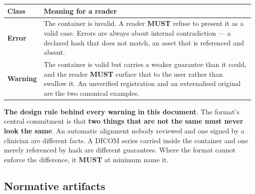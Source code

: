 \documentclass[11pt,a4paper]{article}
\newcommand{\MUST}{\textcolor{uosred}{\textbf{MUST}}}
\begin{document}
\begin{longtable}{L{2.6cm} L{12.8cm}}
\toprule
\textbf{Class} & \textbf{Meaning for a reader}\\
\midrule
\endhead
\textbf{Error} & The container is invalid. A reader \MUST{} refuse to present it as a
valid case. Errors are always about internal contradiction --- a declared hash that does
not match, an asset that is referenced and absent.\\
\textbf{Warning} & The container is valid but carries a weaker guarantee than it could,
and the reader \MUST{} surface that to the user rather than swallow it. An unverified
registration and an externalised original are the two canonical examples.\\
\bottomrule
\end{longtable}

\textbf{The design rule behind every warning in this document}. 
The format's central commitment is that \textbf{two things that are not the same must
never look the same}. An automatic alignment nobody reviewed and one signed by a clinician
are different facts. A DICOM series carried inside the container and one merely referenced
by hash are different guarantees. Where the format cannot enforce the difference, it
\MUST{} at minimum name it.

\subsection{Normative artifacts}\label{sec:artifacts}
\end{document}
